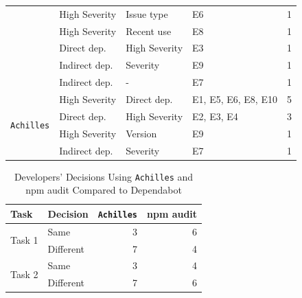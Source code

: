 \documentclass[conference]{IEEEtran}
\begin{document}
\begin{table}[tb]
{\begin{tabular}{cp{2cm}p{2cm}p{1.5cm}r}
				& High Severity & Issue type                      & E6                                            & 1               \\ 
				& High Severity & Recent use                      & E8                                            & 1               \\ 
				& Direct dep.  & High Severity                   & E3                                            & 1               \\ 
				& Indirect dep. & Severity                        & E9                                            & 1               \\ 
				& Indirect dep. & - & E7                                            & 1               \\ 
				\midrule
				\multirow{5}{*}{\texttt{Achilles}}  & High Severity & Direct dep.                          & E1, E5, E6, E8, E10                           & 5               \\ 
				& Direct dep.  & High Severity                   & E2, E3, E4 & 3               \\ 
				& High Severity & Version                         & E9                                            & 1               \\ 
				& Indirect dep. & Severity                        & E7                                            & 1               \\ 
				\bottomrule
			\end{tabular}
		}
		\label{table:prioritization_factor}
	\end{table}
	
\begin{table}[tb]
		\centering
		\caption{Developers' Decisions Using \texttt{Achilles} and npm audit Compared to Dependabot}
		\begin{tabular}{llrr}
			\toprule
			Task & Decision & \texttt{Achilles} & npm audit \\
			\midrule
			\multirow{2}{*}{Task 1} & Same & 3 & 6 \\ 
			& Different & 7 & 4 \\ \midrule
			\multirow{2}{*}{Task 2} & Same & 3 & 4 \\ 
			& Different & 7 & 6 \\
			\bottomrule
		\end{tabular}
		\label{table:compare-ach-npm}
	\end{table}
	
\end{document}
